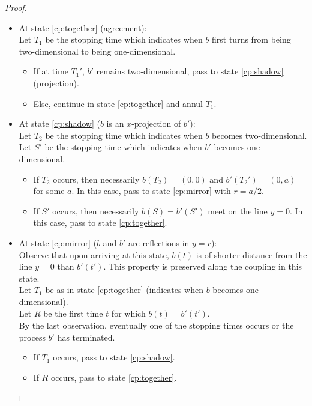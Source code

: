 {\begin{proof}
\begin{itemize}
\item At state \ref{cp:together} (agreement): \\
Let $T_1$ be the stopping time which indicates when $b$ first turns from being two-dimensional to being one-dimensional.
\begin{itemize}
\item  If at time $T_1'$, $b'$ remains two-dimensional, pass to state \ref{cp:shadow} (projection).
    \item Else, continue in state \ref{cp:together} and annul $T_1$.
\end{itemize}

\item At state \ref{cp:shadow} ($b$ is an $x$-projection of $b'$):\\
Let $T_2$ be the stopping time which indicates when $b$ becomes two-dimensional. Let $S'$ be the stopping time which indicates when $b'$ becomes one-dimensional.
\begin{itemize}
\item If $T_2$ occurs, then necessarily $b(T_2)=(0,0)$ and $b'(T_2')=(0,a)$ for some $a$. In this case, pass to state \ref{cp:mirror} with $r=a/2$.
\item If $S'$ occurs, then necessarily $b(S)=b'(S')$ meet on the line $y=0$. In this case, pass to state \ref{cp:together}.
\end{itemize}

\item At state \ref{cp:mirror} ($b$ and $b'$ are reflections in $y=r$):\\
     Observe that upon arriving at this state, $b(t)$ is of shorter distance from the line $y=0$ than $b'(t')$. This property is preserved along the coupling in this state. \\
    Let $T_1$ be as in state \ref{cp:together} (indicates when $b$ becomes one-dimensional). \\
    Let $R$ be the first time $t$ for which $b(t)=b'(t')$.    \\
    By the last observation, eventually one of the stopping times occurs or the process $b'$ has terminated.

    \begin{itemize}
    \item If $T_1$ occurs, pass to state \ref{cp:shadow}.
    \item If $R$ occurs, pass to state \ref{cp:together}.
    \end{itemize}
\end{itemize}\


\end{proof}}
